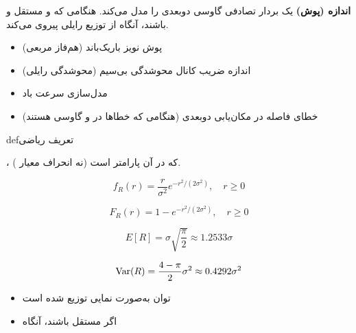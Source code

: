 

\textbf{اندازه (پوش)} یک بردار تصادفی گاوسی دوبعدی را مدل می‌کند. هنگامی که  و  مستقل و  باشند، آنگاه  از توزیع رایلی پیروی می‌کند.


\begin{itemize}
\tightlist
\item
  پوش نویز باریک‌باند (هم‌فاز \lr{+} مربعی)
\item
  اندازه ضریب کانال محوشدگی بی‌سیم (محوشدگی رایلی)
\item
  مدل‌سازی سرعت باد
\item
  خطای فاصله در مکان‌یابی دوبعدی (هنگامی که خطاها در  و  گاوسی هستند)
\end{itemize}

\begin{PSbox}[unbreakable]{def}{تعریف ریاضی}

، که در آن \lr{\ensuremath{\sigma}} پارامتر است (نه انحراف معیار ).

\end{PSbox}


\[f_R(r) = \frac{r}{\sigma^2} e^{-r^2/(2\sigma^2)}, \quad r \geq 0\]


\[F_R(r) = 1 - e^{-r^2/(2\sigma^2)}, \quad r \geq 0\]


\[E[R] = \sigma\sqrt{\frac{\pi}{2}} \approx 1.2533\sigma\]


\[\text{Var}(R) = \frac{4-\pi}{2}\sigma^2 \approx 0.4292\sigma^2\]


\begin{itemize}
\tightlist
\item
   توان به‌صورت نمایی توزیع شده است
\item
  اگر  مستقل باشند، آنگاه 
\end{itemize}

